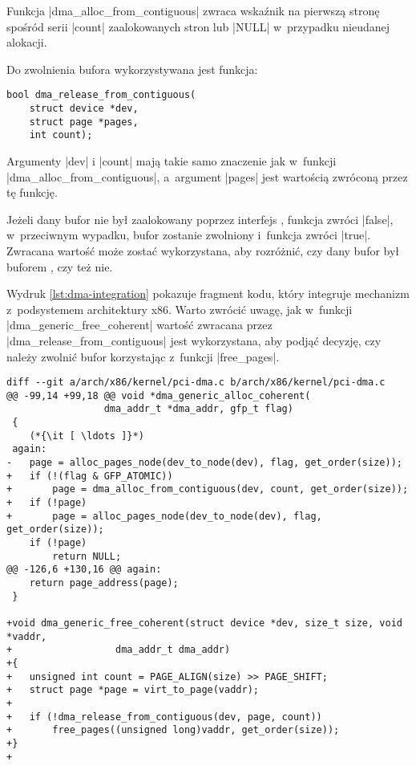 Funkcja \code|dma_alloc_from_contiguous| zwraca wskaźnik na pierwszą
stronę spośród serii \code|count| zaalokowanych stron lub \code|NULL|
w~przypadku nieudanej alokacji.

Do zwolnienia bufora wykorzystywana jest funkcja:

\begin{lstlisting}
bool dma_release_from_contiguous(
	struct device *dev,
	struct page *pages,
	int count);
\end{lstlisting}

Argumenty \code|dev| i \code|count| mają takie samo
znaczenie jak w~funkcji \code|dma_alloc_from_contiguous|,
a~argument \code|pages| jest wartością zwróconą przez tę funkcję.

Jeżeli dany bufor nie był zaalokowany poprzez interfejs , funkcja
zwróci \code|false|, w~przeciwnym wypadku, bufor zostanie zwolniony
i~funkcja zwróci \code|true|.  Zwracana wartość może zostać
wykorzystana, aby rozróżnić, czy dany bufor był buforem , czy też
nie.

Wydruk \ref{lst:dma-integration} pokazuje fragment kodu, który
integruje mechanizm  z~podsystemem  architektury
x86.  Warto zwrócić uwagę, jak w~funkcji
\code|dma_generic_free_coherent| wartość zwracana przez
\code|dma_release_from_contiguous| jest wykorzystana, aby podjąć
decyzję, czy należy zwolnić bufor korzystając z~funkcji
\code|free_pages|.

\begin{lstlisting}[float=bht,caption={Integracja alokatora \acc{CMA} z~podsystemem \acc{DMA}
      architektury x86.},label=lst:dma-integration]
diff --git a/arch/x86/kernel/pci-dma.c b/arch/x86/kernel/pci-dma.c
@@ -99,14 +99,18 @@ void *dma_generic_alloc_coherent(
 				 dma_addr_t *dma_addr, gfp_t flag)
 {
	(*{\it [ \ldots ]}*)
 again:
-	page = alloc_pages_node(dev_to_node(dev), flag, get_order(size));
+	if (!(flag & GFP_ATOMIC))
+		page = dma_alloc_from_contiguous(dev, count, get_order(size));
+	if (!page)
+		page = alloc_pages_node(dev_to_node(dev), flag, get_order(size));
 	if (!page)
 		return NULL;
@@ -126,6 +130,16 @@ again:
 	return page_address(page);
 }

+void dma_generic_free_coherent(struct device *dev, size_t size, void *vaddr,
+			       dma_addr_t dma_addr)
+{
+	unsigned int count = PAGE_ALIGN(size) >> PAGE_SHIFT;
+	struct page *page = virt_to_page(vaddr);
+
+	if (!dma_release_from_contiguous(dev, page, count))
+		free_pages((unsigned long)vaddr, get_order(size));
+}
+
\end{lstlisting}

